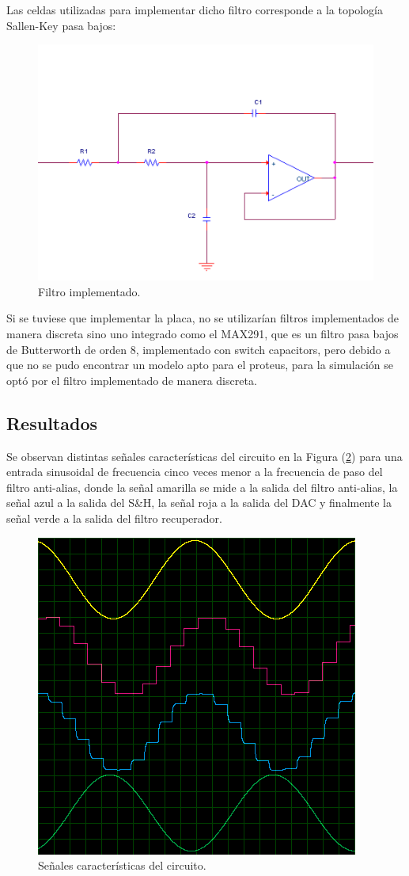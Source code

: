 Las celdas utilizadas para implementar dicho filtro corresponde a la topología Sallen-Key pasa bajos:
\begin{figure}[H]
\centering
\includegraphics[width=0.8\linewidth, page=1]{ImagenesEjercicio1/SK_LP.png}
\caption{Filtro implementado.}
\label{filtros}
\end{figure}
Si se tuviese que implementar la placa, no se utilizarían filtros implementados de manera discreta sino uno integrado como el MAX291, que es un filtro pasa bajos de Butterworth de orden 8, implementado con switch capacitors, pero debido a que no se pudo encontrar un modelo apto para el proteus, para la simulación se optó por el filtro implementado de manera discreta.
\subsection{Resultados}

Se observan distintas señales características del circuito en la Figura (\ref{result1}) para una entrada sinusoidal de frecuencia cinco veces menor a la frecuencia de paso del filtro anti-alias, donde la señal amarilla se mide a la salida del filtro anti-alias, la señal azul a la salida del S\&H, la señal roja a la salida del DAC y finalmente la señal verde a la salida del filtro recuperador.

\begin{figure}[H]
\centering
\includegraphics[width=0.5\linewidth, page=1]{ImagenesEjercicio1/result1.png}
\caption{Señales características del circuito.}
\label{result1}
\end{figure}

